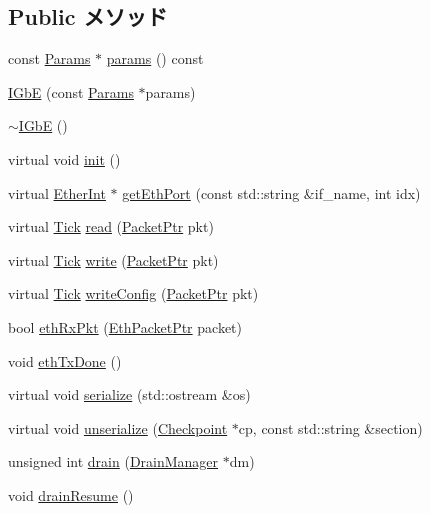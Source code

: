\subsection*{Public メソッド}
\begin{DoxyCompactItemize}
\item 
const \hyperlink{classIGbE_ad27b5cfed87f35a483863a73336d8258}{Params} $\ast$ \hyperlink{classIGbE_acd3c3feb78ae7a8f88fe0f110a718dff}{params} () const 
\item 
\hyperlink{classIGbE_a3e3eef81d3caf789558505740ce0ed07}{IGbE} (const \hyperlink{classIGbE_ad27b5cfed87f35a483863a73336d8258}{Params} $\ast$params)
\item 
\hyperlink{classIGbE_a8ff05c4d178fcac0d8a3ae83db67d89b}{$\sim$IGbE} ()
\item 
virtual void \hyperlink{classIGbE_a02fd73d861ef2e4aabb38c0c9ff82947}{init} ()
\item 
virtual \hyperlink{classEtherInt}{EtherInt} $\ast$ \hyperlink{classIGbE_a10260c5a583c0894dcdcd1ced50a53ae}{getEthPort} (const std::string \&if\_\-name, int idx)
\item 
virtual \hyperlink{base_2types_8hh_a5c8ed81b7d238c9083e1037ba6d61643}{Tick} \hyperlink{classIGbE_a613ec7d5e1ec64f8d21fec78ae8e568e}{read} (\hyperlink{classPacket}{PacketPtr} pkt)
\item 
virtual \hyperlink{base_2types_8hh_a5c8ed81b7d238c9083e1037ba6d61643}{Tick} \hyperlink{classIGbE_a4cefab464e72b5dd42c003a0a4341802}{write} (\hyperlink{classPacket}{PacketPtr} pkt)
\item 
virtual \hyperlink{base_2types_8hh_a5c8ed81b7d238c9083e1037ba6d61643}{Tick} \hyperlink{classIGbE_aac7b61a78530109bfa20923a53064bbf}{writeConfig} (\hyperlink{classPacket}{PacketPtr} pkt)
\item 
bool \hyperlink{classIGbE_aaae8ccdf0f0b15e4d1b93e71a0c8b303}{ethRxPkt} (\hyperlink{classRefCountingPtr}{EthPacketPtr} packet)
\item 
void \hyperlink{classIGbE_a4b170caf60b0a01672ab8e8e3e4dff10}{ethTxDone} ()
\item 
virtual void \hyperlink{classIGbE_a53e036786d17361be4c7320d39c99b84}{serialize} (std::ostream \&os)
\item 
virtual void \hyperlink{classIGbE_af22e5d6d660b97db37003ac61ac4ee49}{unserialize} (\hyperlink{classCheckpoint}{Checkpoint} $\ast$cp, const std::string \&section)
\item 
unsigned int \hyperlink{classIGbE_aa8a18d230dba7a674ac8a0b4f35bc36a}{drain} (\hyperlink{classDrainManager}{DrainManager} $\ast$dm)
\item 
void \hyperlink{classIGbE_a8f020d3237536fe007fc488c4125c5d8}{drainResume} ()
\end{DoxyCompactItemize}
